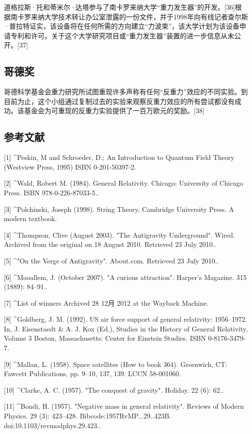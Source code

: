 道格拉斯·托和蒂米尔·达塔参与了南卡罗来纳大学“重力发生器”的开发。[36]根据南卡罗来纳大学技术转让办公室泄露的一份文件，并于1998年向有线记者查尔斯·普拉特证实，该设备将在任何所需的方向建立“力波束”，该大学计划为该设备申请专利和许可。关于这个大学研究项目或“重力发生器”装置的进一步信息从未公开。[37]
\subsection{哥德奖}
哥德科学基金会重力研究所试图重现许多声称有任何“反重力”效应的不同实验。到目前为止，这个小组通过复制过去的实验来观察反重力效应的所有尝试都没有成功。该基金会为可重现的反重力实验提供了一百万欧元的奖励。[38]
\subsection{参考文献}
[1]
^Peskin, M and Schroeder, D.; An Introduction to Quantum Field Theory (Westview Press, 1995) ISBN 0-201-50397-2.

[2]
^Wald, Robert M. (1984). General Relativity. Chicago: University of Chicago Press. ISBN 978-0-226-87033-5..

[3]
^Polchinski, Joseph (1998). String Theory, Cambridge University Press. A modern textbook.

[4]
^Thompson, Clive (August 2003). "The Antigravity Underground". Wired. Archived from the original on 18 August 2010. Retrieved 23 July 2010..

[5]
^"On the Verge of Antigravity". About.com. Retrieved 23 July 2010..

[6]
^Mooallem, J. (October 2007). "A curious attraction". Harper's Magazine. 315 (1889): 84–91..

[7]
^List of winners Archived 28 12月 2012 at the Wayback Machine.

[8]
^Goldberg, J. M. (1992). US air force support of general relativity: 1956–1972. In, J. Eisenstaedt & A. J. Kox (Ed.), Studies in the History of General Relativity, Volume 3 Boston, Massachusetts: Center for Einstein Studies. ISBN 0-8176-3479-7.

[9]
^Mallan, L. (1958). Space satellites (How to book 364). Greenwich, CT: Fawcett Publications, pp. 9–10, 137, 139. LCCN 58-001060.

[10]
^Clarke, A. C. (1957). "The conquest of gravity". Holiday. 22 (6): 62..

[11]
^Bondi, H. (1957). "Negative mass in general relativity". Reviews of Modern Physics. 29 (3): 423–428. Bibcode:1957RvMP...29..423B. doi:10.1103/revmodphys.29.423..

